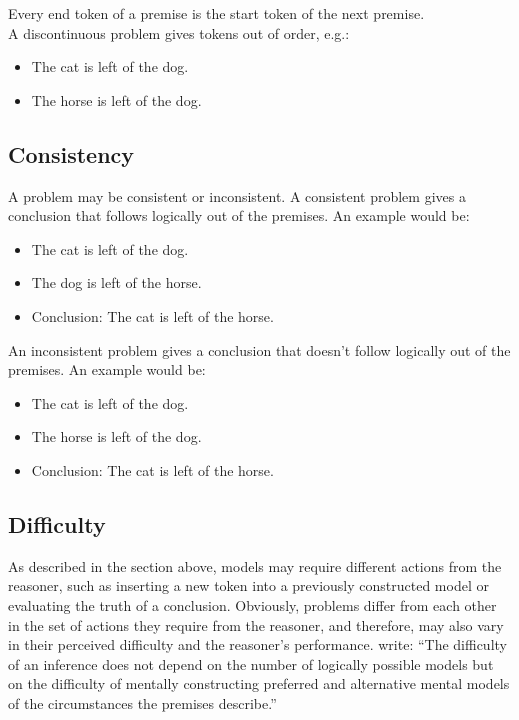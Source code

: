 \documentclass[hidelinks]{scrartcl}
\begin{document}
\noindent Every end \gls{token} of a \gls{premise} is the start \gls{token} of the next \gls{premise}. \\

\noindent A discontinuous problem gives \gls{token}s out of order, e.g.:
\begin{itemize}
\item The cat is left of the dog.
\item The horse is left of the dog.
\end{itemize}

\subsection{Consistency}
A problem may be consistent or inconsistent. A consistent problem gives a \gls{conclusion} that follows logically out of the \gls{premise}s. An example would be:
\begin{itemize}
\item The cat is left of the dog.
\item The dog is left of the horse.
\item Conclusion: The cat is left of the horse.
\end{itemize}

An inconsistent problem gives a \gls{conclusion} that doesn't follow logically out of the \gls{premise}s. An example would be:
\begin{itemize}
\item The cat is left of the dog.
\item The horse is left of the dog.
\item Conclusion: The cat is left of the horse.
\end{itemize}

\subsection{Difficulty}
As described in the section above, models may require different actions from the reasoner, such as inserting a new \gls{token} into a previously constructed model or evaluating the truth of a \gls{conclusion}. Obviously, problems differ from each other in the set of actions they require from the reasoner, and therefore, may also vary in their perceived difficulty and the reasoner's performance. \cite{Ragni.2013} write: ``The difficulty of an inference does not depend on the number of logically possible models but on the difficulty of mentally constructing preferred and alternative mental
models of the circumstances the premises describe.''
\end{document}
